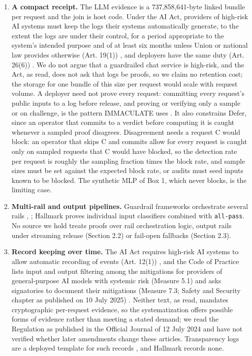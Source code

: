 \documentclass[11pt]{article}
\begin{document}
\begin{enumerate}
\item \textbf{A compact receipt.} The LLM evidence is a 737,858,641-byte linked bundle per request and the join is host code. Under the AI Act, providers of high-risk AI systems must keep the logs their systems automatically generate, to the extent the logs are under their control, for a period appropriate to the system's intended purpose and of at least six months unless Union or national law provides otherwise (Art. 19(1)) \cite{C26}, and deployers have the same duty (Art. 26(6)) \cite{C26}. We do not argue that a guardrailed chat service is high-risk, and the Act, as read, does not ask that logs be proofs, so we claim no retention cost; the storage for one bundle of this size per request would scale with request volume. A deployer need not prove every request: committing every request's public inputs to a log before release, and proving or verifying only a sample or on challenge, is the pattern IMMACULATE uses \cite{C13}. It also constrains Defer, since an operator that commits to a verdict before computing it is caught whenever a sampled proof disagrees. Disagreement needs a request C would block: an operator that skips C and commits allow for every request is caught only on sampled requests that C would have blocked, so the detection rate per request is roughly the sampling fraction times the block rate, and sample sizes must be set against the expected block rate, or audits must seed inputs known to be blocked. The synthetic MLP of Box 1, which never blocks, is the limiting case.
\item \textbf{Multi-rail and output pipelines.} Guardrail frameworks orchestrate several rails \cite{D7}, \cite{D11}; Hallmark proves individual input classifiers combined with \texttt{all-\allowbreak{}pass}. No source we hold treats proofs over rail orchestration logic, output rails under streaming release (Section 2.2) or fail-open fallbacks (Section 2.3).
\item \textbf{Record keeping over time.} The AI Act requires high-risk AI systems to allow automatic recording of events (Art. 12(1)) \cite{C26}, and the Code of Practice lists input and output filtering among the mitigations for providers of general-purpose AI models with systemic risk (Measure 5.1) and asks signatories to document their mitigations (Measure 7.3; Safety and Security chapter as published on 10 July 2025) \cite{D24}. Neither text, as read, mandates cryptographic per-request evidence, so the systematization offers possible forms of evidence rather than meeting a stated demand; we read the Regulation as published in the Official Journal of 12 July 2024 and have not verified whether later amendments change these articles. Transparency logs are a deployed template for such records \cite{C18}, and Hallmark records none.
\end{enumerate}
\end{document}
